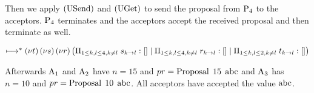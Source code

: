 Then we apply $\Usend$ and $\Uget$ to send the proposal from $\Proposer{4}$ to the acceptors.
$\Proposer{4}$ terminates and the acceptors accept the received proposal and then terminate as well.




$\mapstostar
\NuChannels \big (\InnerSessionQueues{s}
\Or \InnerSessionQueues{r}
\Or \OuterSessionQueues
\big )$

Afterwards $\Acceptor{1}$ and $\Acceptor{2}$ have $n = 15$ and $pr = \ProposalC{15}{\ABC}$ and $\Acceptor{3}$ has $n = 10$ and $pr = \ProposalC{10}{\ABC}$.
All acceptors have accepted the value $\ABC$.



